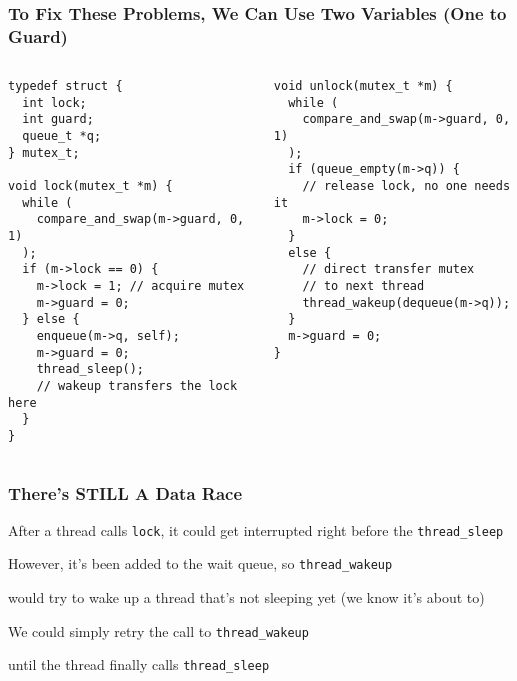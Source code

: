   \begin{frame}[fragile]
    \frametitle{To Fix These Problems, We Can Use Two Variables (One to Guard)}

    \begin{columns}
      \begin{column}{0.5\textwidth}
        \begin{lstlisting}[basicstyle=\scriptsize\ttfamily]
typedef struct {
  int lock;
  int guard;
  queue_t *q;
} mutex_t;

void lock(mutex_t *m) {
  while (
    compare_and_swap(m->guard, 0, 1)
  );
  if (m->lock == 0) {
    m->lock = 1; // acquire mutex
    m->guard = 0;
  } else {
    enqueue(m->q, self);
    m->guard = 0;
    thread_sleep();
    // wakeup transfers the lock here
  }
}
        \end{lstlisting}
      \end{column}
      \begin{column}{0.5\textwidth}
        \begin{lstlisting}[basicstyle=\scriptsize\ttfamily]
void unlock(mutex_t *m) {
  while (
    compare_and_swap(m->guard, 0, 1)
  );
  if (queue_empty(m->q)) {
    // release lock, no one needs it
    m->lock = 0; 
  }
  else {
    // direct transfer mutex
    // to next thread
    thread_wakeup(dequeue(m->q));
  }
  m->guard = 0;
}
        \end{lstlisting}
      \end{column}
    \end{columns}
  \end{frame}

  \begin{frame}
    \frametitle{There's STILL A Data Race}

    After a thread calls \texttt{lock}, it could get interrupted right before
    the \texttt{thread\_sleep}

    \vspace{2em}

    However, it's been added to the wait queue, so \texttt{thread\_wakeup}
    
    would try to wake up a thread that's not sleeping yet (we know it's about
    to)

    \vspace{2em}

    We could simply retry the call to \texttt{thread\_wakeup}
    
    until the thread finally calls \texttt{thread\_sleep}
  \end{frame}

